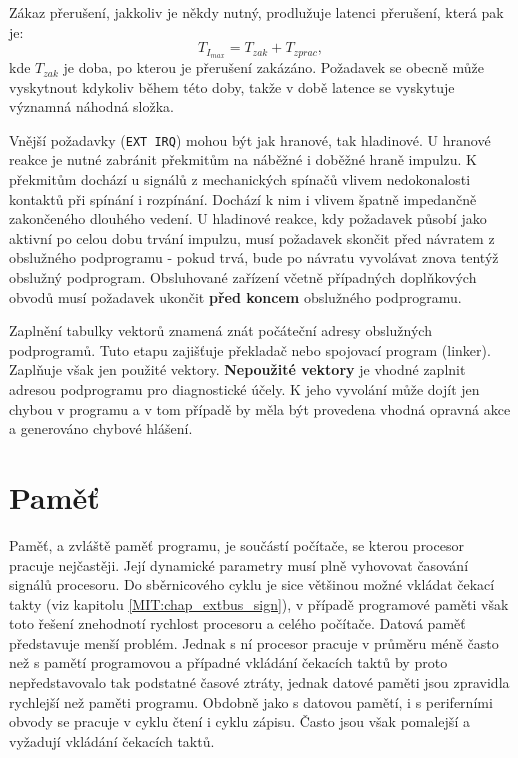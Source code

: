      Zákaz přerušení, jakkoliv je někdy nutný, prodlužuje latenci přerušení, která pak je:
      \begin{equation}
        T_{I_{max}} = T_{zak} + T_{zprac},
      \end{equation}
      kde \(T_{zak}\) je doba, po kterou je přerušení zakázáno. Požadavek se obecně může vyskytnout 
      kdykoliv během této doby, takže v době latence se vyskytuje významná náhodná složka.
      
      Vnější požadavky (\texttt{EXT IRQ}) mohou být jak hranové, tak hladinové. U hranové reakce je 
      nutné zabránit překmitům na náběžné i doběžné hraně impulzu. K překmitům dochází u signálů z 
      mechanických spínačů vlivem nedokonalosti kontaktů při spínání i rozpínání. Dochází k nim i 
      vlivem špatně impedančně zakončeného dlouhého vedení. U hladinové reakce, kdy požadavek 
      působí jako aktivní po celou dobu trvání impulzu, musí požadavek skončit před návratem z 
      obslužného podprogramu - pokud trvá, bude po návratu vyvolávat znova tentýž obslužný 
      podprogram. Obsluhované zařízení včetně případných doplňkových obvodů musí požadavek ukončit 
      \textbf{před koncem} obslužného podprogramu.
      
      Zaplnění tabulky vektorů znamená znát počáteční adresy obslužných podprogramů. Tuto etapu 
      zajišťuje překladač nebo spojovací program (linker). Zaplňuje však jen použité vektory. 
      \textbf{Nepoužité vektory} je vhodné zaplnit adresou podprogramu pro diagnostické účely. K 
      jeho vyvolání může dojít jen chybou v programu a v tom případě by měla být provedena vhodná 
      opravná akce a generováno chybové hlášení.
      
  \section{Paměť}\label{ces:IchapIVsecV}
    Paměť, a zvláště paměť programu, je součástí počítače, se kterou procesor pracuje nejčastěji. 
    Její dynamické parametry musí plně vyhovovat časování signálů procesoru. Do sběrnicového cyklu 
    je sice většinou možné vkládat čekací takty (viz kapitolu \ref{MIT:chap_extbus_sign}), v 
    případě programové paměti však toto řešení znehodnotí rychlost procesoru a celého počítače. 
    Datová paměť představuje menší problém. Jednak s ní procesor pracuje v průměru méně často než s 
    pamětí programovou a případné vkládání čekacích taktů by proto nepředstavovalo tak podstatné 
    časové ztráty, jednak datové paměti jsou zpravidla rychlejší než paměti programu. Obdobně jako 
    s datovou pamětí, i s periferními obvody se pracuje v cyklu čtení i cyklu zápisu. Často jsou 
    však pomalejší a vyžadují vkládání čekacích taktů.
        
